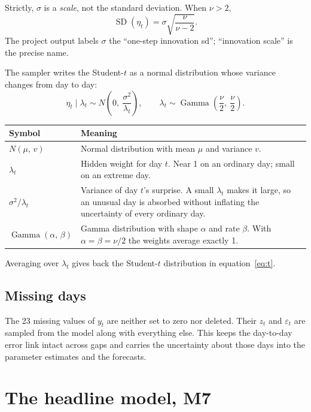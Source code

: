 \documentclass[11pt]{article}
\makeatletter
\DeclareMathOperator{\SD}{SD}
\DeclareMathOperator{\GammaDist}{Gamma}
\newenvironment{reftable}[3]
  {\par\nopagebreak\addvspace{4pt}\noindent
   \renewcommand{\arraystretch}{1.3}%
   \begin{tabular}{@{}>{\raggedright\arraybackslash}p{#1\textwidth}
                      >{\raggedright\arraybackslash}p{\dimexpr0.97\textwidth-#1\textwidth-2\tabcolsep\relax}@{}}
   \toprule \textbf{#2} & \textbf{#3} \\ \midrule}
  {\bottomrule\end{tabular}\par\addvspace{8pt}}
\makeatother
\begin{document}
Strictly, $\sigma$ is a \emph{scale}, not the standard deviation. When
$\nu > 2$,
\begin{equation}
\SD(\eta_t) = \sigma\sqrt{\frac{\nu}{\nu-2}} .
\label{eq:tsd}
\end{equation}
The project output labels $\sigma$ the ``one-step innovation sd''; ``innovation
scale'' is the precise name.

The sampler writes the Student-$t$ as a normal distribution whose variance
changes from day to day:
\begin{equation}
\eta_t \mid \lambda_t \sim N\!\left(0,\ \frac{\sigma^2}{\lambda_t}\right),
\qquad
\lambda_t \sim \GammaDist\!\left(\frac{\nu}{2},\ \frac{\nu}{2}\right).
\label{eq:mix}
\end{equation}

\begin{reftable}{0.2}{Symbol}{Meaning}
$N(\mu,\, v)$ & Normal distribution with mean $\mu$ and variance $v$. \\
$\lambda_t$ & Hidden weight for day $t$. Near 1 on an ordinary day; small on an extreme day. \\
$\sigma^2/\lambda_t$ & Variance of day $t$'s surprise. A small $\lambda_t$ makes it large, so an unusual day is absorbed without inflating the uncertainty of every ordinary day. \\
$\GammaDist(\alpha,\, \beta)$ & Gamma distribution with shape $\alpha$ and rate $\beta$. With $\alpha = \beta = \nu/2$ the weights average exactly 1. \\
\end{reftable}

Averaging over $\lambda_t$ gives back the Student-$t$ distribution in
equation~\eqref{eq:t}.

\subsection{Missing days}

The 23 missing values of $y_t$ are neither set to zero nor deleted. Their $z_t$
and $\varepsilon_t$ are sampled from the model along with everything else. This
keeps the day-to-day error link intact across gaps and carries the uncertainty
about those days into the parameter estimates and the forecasts.

\section{The headline model, M7}
\end{document}
